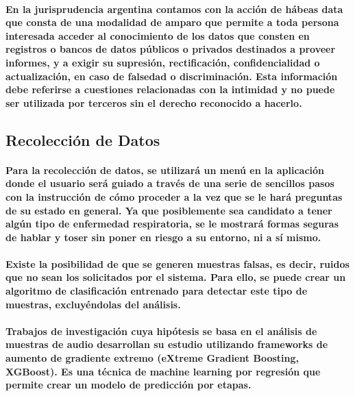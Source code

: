 \documentclass[a4paper,11pt,twocolumn]{article}
\begin{document}
\paragraph{En la jurisprudencia argentina contamos con la acción de hábeas data que consta de una modalidad de amparo que permite a toda persona interesada acceder al conocimiento de los datos que consten en registros o bancos de datos públicos o privados destinados a proveer informes, y a exigir su supresión, rectificación, confidencialidad o actualización, en caso de falsedad o discriminación. Esta información debe referirse a cuestiones relacionadas con la intimidad y no puede ser utilizada por terceros sin el derecho reconocido a hacerlo\cite{habeas-data}.}
\subsection{Recolección de Datos}
\paragraph{Para la recolección de datos, se utilizará un menú en la aplicación donde el usuario será guiado a través de una serie de sencillos pasos con la instrucción de cómo proceder a la vez que se le hará preguntas de su estado en general. Ya que posiblemente sea candidato a tener algún tipo de enfermedad respiratoria, se le mostrará formas seguras de hablar y toser sin poner en riesgo a su entorno, ni a sí mismo\cite{tp}.}
\paragraph{Existe la posibilidad de que se generen muestras falsas, es decir, ruidos que no sean los solicitados por el sistema. Para ello, se puede crear un algoritmo de clasificación entrenado para detectar este tipo de muestras, excluyéndolas del análisis.}
\paragraph{Trabajos de investigación cuya hipótesis se basa en el análisis de muestras de audio desarrollan su estudio utilizando frameworks de aumento de gradiente extremo (eXtreme Gradient Boosting, XGBoost). Es una técnica de machine learning por regresión que permite crear un modelo de predicción por etapas\cite{tp}.}
\end{document}
